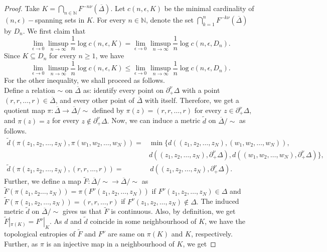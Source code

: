 \documentclass[12pt, reqno]{amsart}
\numberwithin{equation}{section}
\theoremstyle{definition}
\theoremstyle{remark}
\theoremstyle{plain}
\theoremstyle{definition}
\numberwithin{equation}{section}
\begin{document}
\begin{proof}
Take $K=\bigcap_{n\in\mathbb{N}}F^{-n\nu}\left(\overline{\Delta}\right)$. Let $c(n,\epsilon,K)$ be the minimal cardinality of $(n,\epsilon)-$spanning sets in $K$. For every $n\in\mathbb{N}$, denote the set $\bigcap_{k=1}^{n} F^{-k\nu}\left(\overline{\Delta}\right)$ by $D_n$. We first claim that 
\[\lim_{\epsilon\to 0}\limsup_{n\to\infty}\frac{1}{n}\log c(n,\epsilon,K)=\lim_{\epsilon\to 0}\limsup_{n\to\infty}\frac{1}{n}\log c(n,\epsilon,D_n).\]
Since $K\subseteq D_n$ for every $n\geq 1$, we have 
\[\lim_{\epsilon\to 0}\limsup_{n\to\infty}\frac{1}{n}\log c(n,\epsilon,K)\leq\lim_{\epsilon\to 0}\limsup_{n\to\infty}\frac{1}{n}\log c(n,\epsilon,D_n).\]
For the other inequality, we shall proceed as follows.\\
Define a relation $\sim$ on $\overline{\Delta}$ as: identify every point on $\partial^{\nu}_+\Delta$ with a point $(r,r,\dots,r)\in \overline{\Delta}$, and every other point of $\overline{\Delta}$ with itself. Therefore, we get a quotient map $\pi: \overline{\Delta}\to\overline{\Delta}/{\sim}$ defined by 
$\pi(z)=(r,r,\dots,r)$ for every $z\in \partial^{\nu}_+\Delta$, and $\pi(z)=z$ for every $z\not\in \partial^{\nu}_+\Delta.$ Now, we can induce a metric $\widetilde{d}$ on $\overline{\Delta}/{\sim}$ as follows.
\begin{align*}
\widetilde{d}(\pi(z_1,z_2,\dots,z_N), \pi(w_1,w_2,\dots,w_N))=&\min\{d((z_1,z_2,\dots,z_N), (w_1,w_2,\dots,w_N)), \\
&d((z_1,z_2,\dots,z_N), \partial^{\nu}_+\Delta), d((w_1,w_2,\dots,w_N), \partial^{\nu}_+\Delta)\},\\
\widetilde{d}(\pi(z_1,z_2,\dots,z_N), (r,r,\dots,r))=&\, d((z_1,z_2,\dots,z_N), \partial^{\nu}_+\Delta).
\end{align*}
Further, we define a map $\widetilde{F}:\overline{\Delta}/{\sim}\to\overline{\Delta}/{\sim} $ as $\widetilde{F}(\pi(z_1,z_2\dots,z_N))=\pi(F^{\nu}(z_1,z_2,\dots,z_N))$ if $F^{\nu}(z_1,z_2,\dots,z_N)\in\Delta$ and $\widetilde{F}(\pi(z_1,z_2,\dots,z_N))=(r,r,\dots,r)$ if $F^{\nu}(z_1,z_2,\dots,z_N)\not\in \Delta.$ 
The induced metric $\widetilde{d}$ on $\overline{\Delta}/{\sim}$ gives us that $\widetilde{F}$ is continuous. Also, by definition, we get $\widetilde{F}|_{\pi(K)}=F^{\nu}|_{K}.$ As $d$ and $\widetilde{d}$ coincide in some neighbourhood of $K$,  we have the topological entropies of $\widetilde{F}$ and $F^{\nu}$ are same on $\pi(K)$ and $K$, respectively. Further, as $\pi$ is an injective map in a neighbourhood of $K$, we get 

\end{proof}
\end{document}
